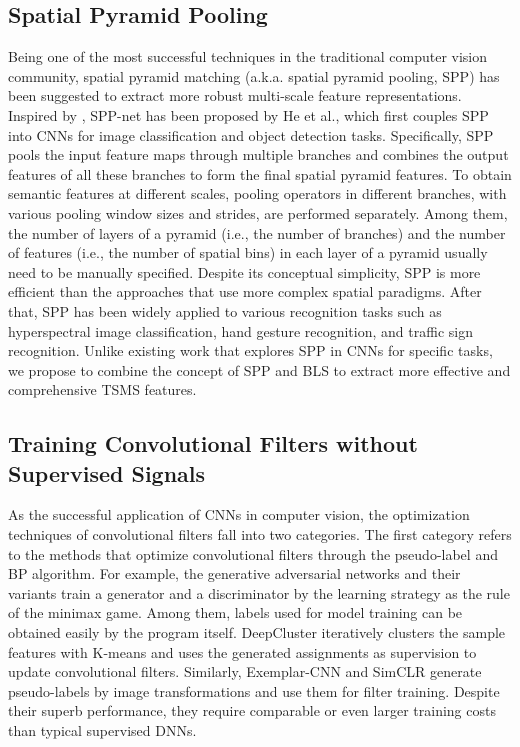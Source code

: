 \documentclass[lettersize,journal]{IEEEtran}
\begin{document}
\subsection{Spatial Pyramid Pooling}
Being one of the most successful techniques in the traditional computer vision community, spatial pyramid matching\cite{grauman2005pyramid, lazebnik2006beyond} (a.k.a. spatial pyramid pooling, SPP) has been suggested to extract more robust multi-scale feature representations. Inspired by \cite{grauman2005pyramid, lazebnik2006beyond}, SPP-net\cite{he2015spatial} has been proposed by He et al., which first couples SPP into CNNs for image classification and object detection tasks. Specifically, SPP pools the input feature maps through multiple branches and combines the output features of all these branches to form the final spatial pyramid features. To obtain semantic features at different scales, pooling operators in different branches, with various pooling window sizes and strides, are performed separately. Among them, the number of layers of a pyramid (i.e., the number of branches) and the number of features (i.e., the number of spatial bins) in each layer of a pyramid usually need to be manually specified. Despite its conceptual simplicity, SPP is more efficient than the approaches that use more complex spatial paradigms.
After that, SPP has been widely applied to various recognition tasks such as hyperspectral image classification\cite{yue2016deep}, hand gesture recognition\cite{tan2021convolutional, ashiquzzaman2020compact}, and traffic sign recognition\cite{dewi2020evaluation, tai2020deep}. Unlike existing work that explores SPP in CNNs for specific tasks, we propose to combine the concept of SPP and BLS to extract more effective and comprehensive TSMS features.

\subsection{Training Convolutional Filters without Supervised Signals}  
As the successful application of CNNs in computer vision\cite{lecun1989handwritten, krizhevsky2012imagenet, simonyan2014very}, the optimization techniques of convolutional filters fall into two categories. The first category refers to the methods that optimize convolutional filters through the pseudo-label and BP algorithm. For example, the generative adversarial networks and their variants\cite{goodfellow2020generative, radford2015unsupervised, chen2016infogan} train a generator and a discriminator by the learning strategy as the rule of the minimax game. Among them, labels used for model training can be obtained easily by the program itself. DeepCluster\cite{caron2018deep} iteratively clusters the sample features with K-means and uses the generated assignments as supervision to update convolutional filters. Similarly, Exemplar-CNN\cite{dosovitskiy2014discriminative} and SimCLR\cite{chen2020simple} generate pseudo-labels by image transformations and use them for filter training. Despite their superb performance, they require comparable or even 
larger training costs than typical supervised DNNs.
\end{document}

